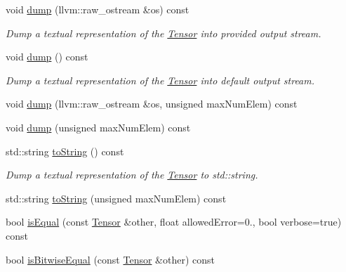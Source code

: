 \begin{DoxyCompactItemize}
\mbox{\label{classglow_1_1_tensor_ab1c4661689063631677e9607cd04a1e3}} 
void \hyperlink{classglow_1_1_tensor_ab1c4661689063631677e9607cd04a1e3}{dump} (llvm\+::raw\+\_\+ostream \&os) const
\begin{DoxyCompactList}\small\item\em Dump a textual representation of the \hyperlink{classglow_1_1_tensor}{Tensor} into provided output stream. \end{DoxyCompactList}\item 
\mbox{\label{classglow_1_1_tensor_a9ae22fafeb2d202f793c585876791793}} 
void \hyperlink{classglow_1_1_tensor_a9ae22fafeb2d202f793c585876791793}{dump} () const
\begin{DoxyCompactList}\small\item\em Dump a textual representation of the \hyperlink{classglow_1_1_tensor}{Tensor} into default output stream. \end{DoxyCompactList}\item 
void \hyperlink{classglow_1_1_tensor_ac67a66dc3db1ac2e30c341552e93e20d}{dump} (llvm\+::raw\+\_\+ostream \&os, unsigned max\+Num\+Elem) const
\item 
void \hyperlink{classglow_1_1_tensor_afb64938f01ec86bb60020eebb1edf4e1}{dump} (unsigned max\+Num\+Elem) const
\item 
\mbox{\label{classglow_1_1_tensor_ad2c052b4150fd71d91a2185873f75bb6}} 
std\+::string \hyperlink{classglow_1_1_tensor_ad2c052b4150fd71d91a2185873f75bb6}{to\+String} () const
\begin{DoxyCompactList}\small\item\em Dump a textual representation of the \hyperlink{classglow_1_1_tensor}{Tensor} to std\+::string. \end{DoxyCompactList}\item 
std\+::string \hyperlink{classglow_1_1_tensor_a306995cc2d51a2676bef62bca462e2c4}{to\+String} (unsigned max\+Num\+Elem) const
\item 
bool \hyperlink{classglow_1_1_tensor_adc8169ad48bdffbd2e8fa18b914cc73a}{is\+Equal} (const \hyperlink{classglow_1_1_tensor}{Tensor} \&other, float allowed\+Error=0., bool verbose=true) const
\item 
bool \hyperlink{classglow_1_1_tensor_a9e4db56127af74adb5d9d6315bd6813c}{is\+Bitwise\+Equal} (const \hyperlink{classglow_1_1_tensor}{Tensor} \&other) const

\end{DoxyCompactItemize}
